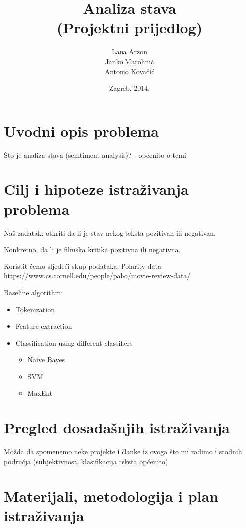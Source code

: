 \documentclass[10pt,a4paper,titlepage]{article}
\title{Analiza stava\\(Projektni prijedlog)}
\author{Lana Arzon\\Janko Marohnić\\Antonio Kovačić}
\date{Zagreb, 2014.}
\begin{document}
\maketitle

\tableofcontents

\newpage

\section{Uvodni opis problema}

Što je analiza stava (semtiment analysis)? - općenito o temi

\section{Cilj i hipoteze istraživanja problema}

Naš zadatak: otkriti da li je stav nekog teksta pozitivan ili negativan.

Konkretno, da li je filmska kritika pozitivna ili negativna.

Koristit ćemo sljedeći skup podataka: Polarity data \\
\url{https://www.cs.cornell.edu/people/pabo/movie-review-data/}

Baseline algorithm:

\begin{itemize}
	\item Tokenization
	\item Feature extraction
	\item Classification using different classifiers
	\begin{itemize}
		\item Naive Bayes
		\item SVM
		\item MaxEnt
	\end{itemize}
\end{itemize}

\section{Pregled dosadašnjih istraživanja}

Možda da spomenemo neke projekte i članke iz ovoga što mi radimo i srodnih područja (subjektivnost, klasifikacija teksta općenito)

\section{Materijali, metodologija i plan istraživanja}
\end{document}
